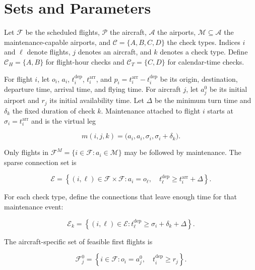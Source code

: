 \documentclass[11pt,a4paper]{article}
\newcommand{\F}{\mathcal{F}}
\newcommand{\Pset}{\mathcal{P}}
\newcommand{\Aset}{\mathcal{A}}
\newcommand{\Cset}{\mathcal{C}}
\newcommand{\Eset}{\mathcal{E}}
\newcommand{\Mset}{\mathcal{M}}
\begin{document}
\section{Sets and Parameters}

Let $\F$ be the scheduled flights, $\Pset$ the aircraft, $\Aset$ the airports,
$\Mset\subseteq\Aset$ the maintenance-capable airports, and
$\Cset=\{A,B,C,D\}$ the check types. Indices $i$ and $\ell$ denote flights,
$j$ denotes an aircraft, and $k$ denotes a check type. Define
$\Cset_H=\{A,B\}$ for flight-hour checks and $\Cset_T=\{C,D\}$ for
calendar-time checks.

For flight $i$, let $o_i$, $a_i$, $t_i^{\mathrm{dep}}$,
$t_i^{\mathrm{arr}}$, and $p_i=t_i^{\mathrm{arr}}-t_i^{\mathrm{dep}}$
be its origin, destination, departure time, arrival time, and flying time.
For aircraft $j$, let $a^0_j$ be its initial airport and $r_j$ its initial
availability time. Let $\Delta$ be the minimum turn time and $\delta_k$ the
fixed duration of check $k$. Maintenance attached to flight $i$ starts at
$\sigma_i=t_i^{\mathrm{arr}}$ and is the virtual leg

\begin{equation}
  m(i,j,k)=\bigl(a_i,a_i,\sigma_i,\sigma_i+\delta_k\bigr).
  \label{eq:virtual_leg}
\end{equation}

Only flights in $\F^M=\{i\in\F:a_i\in\Mset\}$ may be followed by
maintenance. The sparse connection set is

\begin{equation}
  \Eset=\left\{(i,\ell)\in\F\times\F:
  a_i=o_\ell,\quad
  t_\ell^{\mathrm{dep}}\geq t_i^{\mathrm{arr}}+\Delta\right\}.
  \label{eq:connection_set}
\end{equation}

For each check type, define the connections that leave enough time for that
maintenance event:

\begin{equation}
  \Eset_k=\left\{(i,\ell)\in\Eset:
  t_\ell^{\mathrm{dep}}\geq\sigma_i+\delta_k+\Delta\right\}.
  \label{eq:maintenance_connection_set}
\end{equation}

The aircraft-specific set of feasible first flights is

\begin{equation}
  \F^0_j=\left\{i\in\F:o_i=a^0_j,\quad
  t_i^{\mathrm{dep}}\geq r_j\right\}.
  \label{eq:first_flight_set}
\end{equation}
\end{document}
